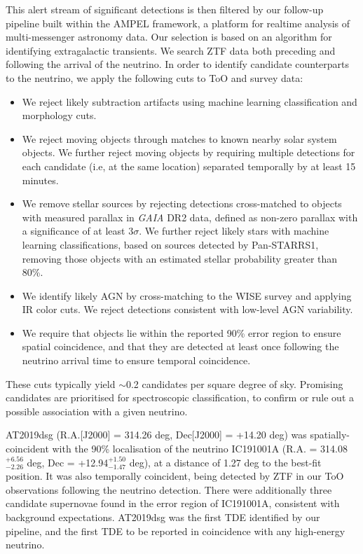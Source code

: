 \documentclass{nature_plusfigure}
\begin{document}
\begin{methods}
This alert stream of significant detections is then filtered by our follow-up pipeline built within the AMPEL framework, a platform for realtime analysis of multi-messenger astronomy data\cite{2019A&A...631A.147N}. Our selection is based on an algorithm for identifying extragalactic transients\cite{2019A&A...631A.147N}. We search ZTF data both preceding and following the arrival of the neutrino. In order to identify candidate counterparts to the neutrino, we apply the following cuts to ToO and survey data:

\begin{itemize}
	\item We reject likely subtraction artifacts using machine learning classification and morphology cuts\cite{2019PASP..131c8002M}.
	\item We reject moving objects through matches to known nearby solar system objects\cite{2019PASP..131a8003M}. We further reject moving objects by requiring multiple  detections for each candidate (i.e, at the same location) separated temporally by at least 15 minutes.
	\item We remove stellar sources by rejecting detections cross-matched\cite{2018PASP..130g5002S} to objects with measured parallax in \textit{GAIA} DR2 data\cite{2018A&A...616A...1G}, defined as non-zero parallax with a significance of at least 3$\sigma$. We further reject likely stars with machine learning classifications\cite{2018PASP..130l8001T}, based on sources detected by Pan-STARRS1\cite{2016arXiv161205560C}, removing those objects with an estimated stellar probability greater than 80\%.
	\item We identify likely AGN by cross-matching to the WISE survey and applying IR color cuts\cite{2010AJ....140.1868W}. We reject detections consistent with low-level AGN variability. 
	\item We require that objects lie within the reported 90\% error region to ensure spatial coincidence, and that they are detected at least once following the neutrino arrival time to ensure temporal coincidence.
\end{itemize}

These cuts typically yield $\sim$0.2 candidates per square degree of sky. Promising candidates are prioritised for spectroscopic classification, to confirm or rule out a possible association with a given neutrino. 

AT2019dsg (R.A.[J2000] = 314.26 deg, Dec[J2000] = +14.20 deg) was spatially-coincident with the 90\% localisation of the neutrino IC191001A\cite{stein:gcn25913} (R.A. = 314.08$^{+6.56}_{-2.26}$ deg,  Dec = +12.94$^{+1.50}_{-1.47}$ deg), at a distance of 1.27 deg to the best-fit position. It was also temporally coincident, being detected by ZTF in our ToO observations following the neutrino detection. There were additionally three candidate supernovae found in the error region of IC191001A,  consistent with background expectations.  AT2019dsg was the first TDE identified by our pipeline, and the first TDE to be reported in coincidence with any high-energy neutrino.


\end{methods}
\end{document}
